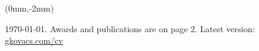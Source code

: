 \documentclass[margin,line]{resume}
\begin{document}
\vspace{-20mm}

\begin{textblock*}{17cm}(0mm,-2mm) %
\begin{small}
\begin{center}
   \today. Awards and publications are on page 2. Latest version: \href{https://www.gkovacs.com/resume.pdf}{gkovacs.com/cv}
\end{center}
\end{small}

\end{textblock*}

\vspace{-5.0mm}

\end{document}
